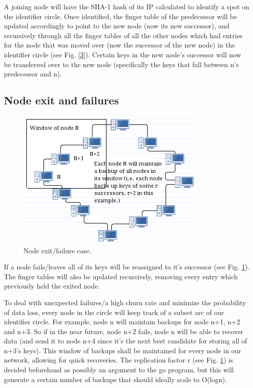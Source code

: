 \documentclass[fleqn,24pt]{SelfArx} %
\begin{document}
A joining node will have the SHA-1 hash of its IP calculated to identify a spot on the identifier circle. Once identified, the finger table of the predecessor will be updated accordingly to point to the new node (now its new successor), and recursively through all the finger tables of all the other nodes which had entries for the node that was moved over (now the successor of the new node) in the identifier circle (see Fig. \ref{3}). Certain keys in the new node’s successor will now be transferred over to the new node (specifically the keys that fall between n’s predecessor and n). 

\subsection{Node exit and failures}

\begin{figure}[!htb]
\includegraphics{2016-02-29.png}
\caption{\label{family}Node exit/failure case.}
\label{4}
\end{figure}

If a node fails/leaves all of its keys will be reassigned to it’s successor (see Fig. \ref{4}). The finger tables will also be updated recursively, removing every entry which previously held the exited node.

To deal with unexpected failures/a high churn rate and minimize the probability of data loss, every node in the circle will keep track of a subset arc of our identifier circle. For example, node n will maintain backups for node n+1, n+2 and n+3. So if in the near future, node n+2 fails, node n will be able to recover data (and send it to node n+4 since it’s the next best candidate for storing all of n+3’s keys). This window of backups shall be maintained for every node in our network, allowing for quick recoveries. The replication factor r (see Fig. \ref{4}) is decided beforehand as possibly an argument to the go program, but this will generate a certain number of backups that should ideally scale to O(logn).
\end{document}
